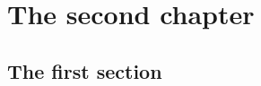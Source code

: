 \chapter{The second chapter}
\thispagestyle{fancy}
\label{ch1}

\section{The first section}
\lipsum
